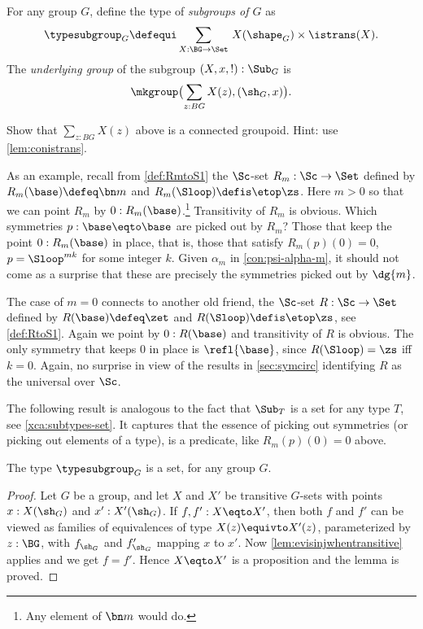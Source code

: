 \begin{definition}\label{def:set-of-subgroups}
  For any group $G$, define the type of \emph{subgroups of $G$} as
  $$\typesubgroup_G\defequi\sum_{X:\BG\to\Set}{\,}X(\shape_G)
  \times\istrans(X).$$
  The \emph{underlying group} of the subgroup $(X,x,!) : \Sub_G$ is
  $$\mkgroup \bigl(\sum_{z:BG}X(z),(\sh_G,x)\bigr).\qedhere$$
\end{definition}

\begin{xca}\label{xca:group-Xx!}
Show that $\sum_{z:BG}X(z)$ above is a connected groupoid.
Hint: use \cref{lem:conistrans}.
\end{xca}

As an example, recall from \cref{def:RmtoS1} the $\Sc$-set
$R_m : \Sc\to\Set$ defined by $R_m(\base) \defeq \bn m$ and
$R_m(\Sloop) \defis \etop\zs$. Here $m>0$ so that we can point
$R_m$ by $0: R_m(\base)$.\footnote{Any element of $\bn m$ would do.} 
Transitivity of $R_m$ is obvious.
Which symmetries $p: \base\eqto\base$ are picked out by $R_m$?
Those that keep the point $0: R_m(\base)$ in place, that is,
those that satisfy $R_m(p)(0)=0$, \ie $p=\Sloop^{mk}$ for some integer $k$.
Given $\alpha_m$ in \cref{con:psi-alpha-m}, it should not come as a 
surprise that these are precisely the symmetries picked out by $\dg{m}$.

The case of $m=0$ connects to another old friend, the $\Sc$-set
$R : \Sc\to\Set$ defined by $R(\base) \defeq \zet$ and
$R(\Sloop) \defis \etop\zs$, see \cref{def:RtoS1}.
Again we point by $0: R(\base)$ and transitivity of $R$ is obvious.
The only symmetry that keeps $0$ in place is $\refl{\base}$,
since $R(\Sloop)= \zs$ iff $k=0$.
Again, no surprise in view of the results in \cref{sec:symcirc}
identifying $R$ as the universal \covering over $\Sc$.

The following result is analogous to the fact that $\Sub_T$ is
a set for any type $T$, see \cref{xca:subtypes-set}. It captures
that the essence of picking out symmetries (or picking out elements
of a type), is a predicate, like $R_m(p)(0)=0$ above.

\begin{lemma}
  \label{lem:SubGisset}%
  The type $\typesubgroup_G$ is a set, for any group $G$.   
\end{lemma}
\begin{proof}
Let $G$ be a group, and let $X$ and $X'$ be transitive $G$-sets with
points $x:X(\sh_G)$ and $x':X'(\sh_G)$. If $f,f': X\eqto X'$,
then both $f$ and $f'$ can be viewed as families of equivalences of
type $X(z) \equivto X'(z)$, parameterized by $z:\BG$,
with $f_{\sh_G}$ and $f'_{\sh_G}$ mapping $x$ to $x'$.
Now \cref{lem:evisinjwhentransitive} applies and we get $f=f'$.
Hence $X\eqto X'$ is a proposition and the lemma is proved.
\end{proof}

